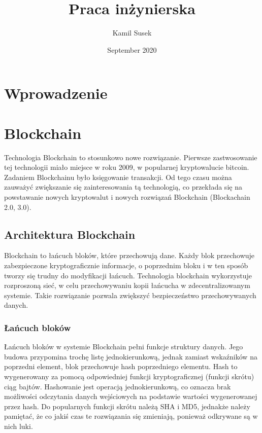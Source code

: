 \documentclass{report}
\begin{document}
\begin{titlepage}

\title{Praca inżynierska}
\author{Kamil Susek}
\date{September 2020}

\maketitle
\end{titlepage}
\chapter{Wprowadzenie}
\newpage
\chapter{Blockchain}
Technologia Blockchain to stosunkowo nowe rozwiązanie. Pierwsze zastwosowanie tej technologii miało miejsce w roku 2009, w popularnej kryptowalucie bitcoin. Zadaniem Blockchainu było księgowanie transakcji. Od tego czasu można zauważyć zwiększanie się zainteresowania tą technologią, co przekłada się na powstawanie nowych kryptowalut i nowych rozwiązań Blockchain (Blockachain 2.0, 3.0).
\section{Architektura Blockchain}
Blockchain to łańcuch bloków, które przechowują dane. Każdy blok przechowuje zabezpieczone kryptograficznie informacje, o poprzednim bloku i w ten sposób tworzy się trudny do modyfikacji łańcuch. Technologia blockchain wykorzystuje rozproszoną sieć, w celu przechowywaniu kopii łańcucha w zdecentralizowanym systemie. Takie rozwiązanie pozwala zwiększyć bezpieczeństwo przechowywanych danych.
\subsection{Łańcuch bloków}
Łańcuch bloków w systemie Blockchain pełni funkcje struktury danych. Jego budowa przypomina trochę listę jednokierunkową, jednak zamiast wskaźników na poprzedni element, blok przechowuje hash poprzedniego elementu. Hash to wygenerowany za pomocą odpowiedniej funkcji kryptograficznej (funkcji skrótu) ciąg bajtów. Hashowanie jest operacją jednokierunkową, co oznacza brak możliwości odczytania danych wejściowych na podstawie wartości wygenerowanej przez hash.
Do popularnych funkcji skrótu należą SHA i MD5, jednakże należy pamiętać, że co jakiś czas te rozwiązania się zmieniają, ponieważ odkrywane są w nich luki.
\end{document}
